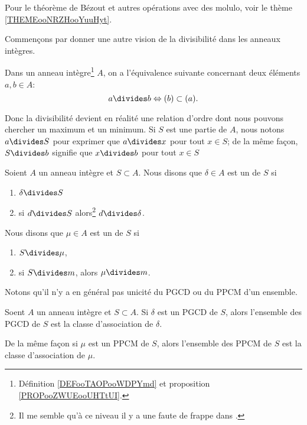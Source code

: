 Pour le théorème de Bézout et autres opérations avec des molulo, voir le thème \ref{THEMEooNRZHooYuuHyt}.

Commençons par donner une autre vision de la divisibilité dans les anneaux intègres.
\begin{proposition}\label{PropDiviseurIdeaux}
    Dans un anneau intègre\footnote{Définition \ref{DEFooTAOPooWDPYmd} et proposition \ref{PROPooZWUEooUHTtUI}.} $A$, on a l'équivalence suivante concernant deux éléments \( a, b \in A \):
\begin{equation}
    a\divides b\Leftrightarrow (b)\subset (a).
\end{equation}
\end{proposition}

Donc la divisibilité devient en réalité une relation d'ordre dont nous pouvons chercher un maximum et un minimum. Si \( S\) est une partie de \( A\), nous notons \( a\divides S\) pour exprimer que \( a\divides x\) pour tout \( x\in S\); de la même façon, \( S\divides b\) signifie que \( x\divides b\) pour tout \( x\in S\)

\begin{definition}\label{DefrYwbct}
    Soient \( A\) un anneau intègre et \( S\subset A\). Nous disons que \( \delta\in A\) est un  de \( S\) si
    \begin{enumerate}
        \item
            \( \delta\divides S\)
        \item
            si \( d\divides S\) alors\footnote{Il me semble qu'à ce niveau il y a une faute de frappe dans \cite{XPXxPl}.} \( d\divides \delta\).
    \end{enumerate}
    Nous disons que \( \mu\in A\) est un  de \( S\) si
    \begin{enumerate}
        \item
            \( S\divides \mu\),
        \item
            si \( S\divides m\), alors \( \mu\divides m\).
    \end{enumerate}
\end{definition}
Notons qu'il n'y a en général pas unicité du PGCD ou du PPCM d'un ensemble.

\begin{lemma}
    Soent \( A\) un anneau intègre et \( S\subset A\). Si \( \delta\) est un PGCD de \( S\), alors l'ensemble des PGCD de \( S\) est la classe d'association de \( \delta\).

    De la même façon si \( \mu\) est un PPCM de \( S\), alors l'ensemble des PPCM de \( S\) est la classe d'association de \( \mu\).
\end{lemma}

